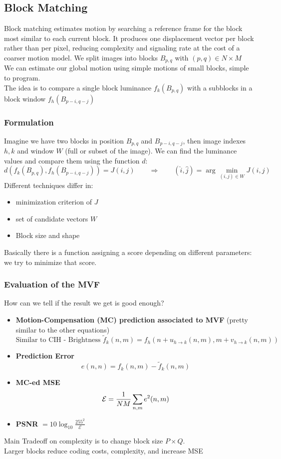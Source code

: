 \subsection{Block Matching}
Block matching estimates motion by searching a reference frame for the block most similar to each current block. It produces one displacement vector per block rather than per pixel, reducing complexity and signaling rate at the cost of a coarser motion model.
We split images into blocks $B_{p,q}$ with $(p,q) \in N \times M$\\
We can estimate our global motion using simple motions of small blocks, simple to program.\\
The idea is to compare a single block luminance $f_k(B_{p,q})$ with a subblocks in a block window $f_h(B_{p-i, q-j})$
\subsubsection{Formulation}
Imagine we have two blocks in position $B_{p,q}$ and $B_{p-i,q-j}$, then image indexes $h,k$ and window $W$ (full or subset of the image). We can find the luminance values and compare them using the function $d$:
$$d\left(f_k(B_{p,q}),f_h(B_{p-i,q-j})\right) = J(i,j) \qquad \Longrightarrow \qquad (\hat{i},\hat{j}) = \arg\min_{(i,j) \in W}J(i,j)$$
Different techniques differ in:
\begin{itemize}
    \item minimization criterion of $J$
    \item set of candidate vectors $W$
    \item Block size and shape
\end{itemize}
Basically there is a function assigning a score depending on different parameters: we try to minimize that score.
\subsubsection{Evaluation of the MVF}
How can we tell if the result we get is good enough?
\begin{itemize}
    \item \textbf{Motion-Compensation (MC) prediction associated to MVF} (pretty similar to the other equations) $$\text{Similar to CIH - Brightness }\tilde{f}_k(n,m) = f_h(n + u_{h\to k}(n,m), m + v_{h\to k}(n,m))$$
    \item \textbf{Prediction Error} $$e(n,n) = f_k(n,m) - \tilde{f}_k(n,m)$$
    \item \textbf{MC-ed MSE} $$ \mathcal{E} = \frac{1}{NM}\sum_{n,m}^{}e^2(n,m)$$
    \item \textbf{PSNR} $=10\log_{10}\frac{255^2}{\mathcal{E}}$
\end{itemize}
Main Tradeoff on complexity is to change block size $P \times Q$.\\
Larger blocks reduce coding costs, complexity, and increase MSE
